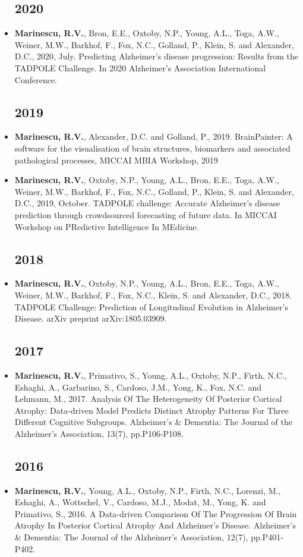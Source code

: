 \documentclass[a4paper,10pt]{article} %
\begin{document}
\begin{itemize}

\subsection*{2020}
\item[\talk] \textbf{Marinescu, R.V.}, Bron, E.E., Oxtoby, N.P., Young, A.L., Toga, A.W., Weiner, M.W., Barkhof, F., Fox, N.C., Golland, P., Klein, S. and Alexander, D.C., 2020, July. Predicting Alzheimer's disease progression: Results from the TADPOLE Challenge. In 2020 Alzheimer's Association International Conference.

\subsection*{2019}
\item[\talk] \textbf{Marinescu, R.V.}, Alexander, D.C. and Golland, P., 2019. BrainPainter: A software for the visualisation of brain structures, biomarkers and associated pathological processes, MICCAI MBIA Workshop, 2019
\item[\talk] \textbf{Marinescu, R.V.}, Oxtoby, N.P., Young, A.L., Bron, E.E., Toga, A.W., Weiner, M.W., Barkhof, F., Fox, N.C., Golland, P., Klein, S. and Alexander, D.C., 2019, October. TADPOLE challenge: Accurate Alzheimer's disease prediction through crowdsourced forecasting of future data. In MICCAI Workshop on PRedictive Intelligence In MEdicine.
\subsection*{2018}
\item[\journal] \textbf{Marinescu, R.V.}, Oxtoby, N.P., Young, A.L., Bron, E.E., Toga, A.W., Weiner, M.W., Barkhof, F., Fox, N.C., Klein, S. and Alexander, D.C., 2018. TADPOLE Challenge: Prediction of Longitudinal Evolution in Alzheimer's Disease. arXiv preprint arXiv:1805.03909.
\subsection*{2017}
\item[\poster] \textbf{Marinescu, R.V.}, Primativo, S., Young, A.L., Oxtoby, N.P., Firth, N.C., Eshaghi, A., Garbarino, S., Cardoso, J.M., Yong, K., Fox, N.C. and Lehmann, M., 2017. Analysis Of The Heterogeneity Of Posterior Cortical Atrophy: Data-driven Model Predicts Distinct Atrophy Patterns For Three Different Cognitive Subgroups. Alzheimer's \& Dementia: The Journal of the Alzheimer's Association, 13(7), pp.P106-P108.
\subsection*{2016}
\item[\poster] \textbf{Marinescu, R.V.}, Young, A.L., Oxtoby, N.P., Firth, N.C., Lorenzi, M., Eshaghi, A., Wottschel, V., Cardoso, M.J., Modat, M., Yong, K. and Primativo, S., 2016. A Data-driven Comparison Of The Progression Of Brain Atrophy In Posterior Cortical Atrophy And Alzheimer's Disease. Alzheimer's \& Dementia: The Journal of the Alzheimer's Association, 12(7), pp.P401-P402.
\end{itemize}
\end{document}
